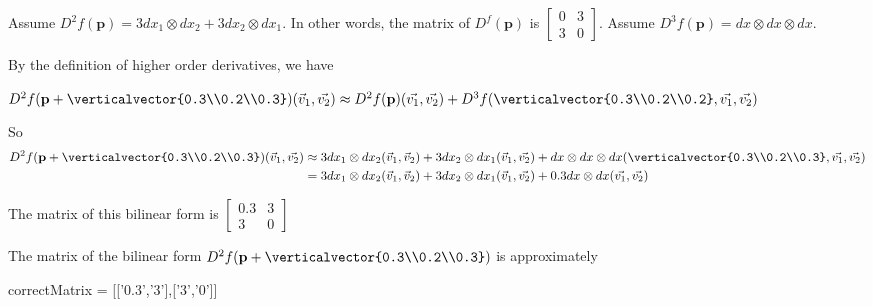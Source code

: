 \documentclass{ximera}
\begin{document}
\begin{question}
  Assume \(D^2f(\mathbf{p}) = 3dx_1\otimes dx_2 + 3dx_2 \otimes dx_1\).  In other words, the matrix of $D^f(\mathbf{p})$ is 
  \(\begin{bmatrix} 0 & 3\\ 3&0 \end{bmatrix}\).  Assume $D^3f(\mathbf{p}) = dx \otimes dx \otimes dx$.
  \begin{solution}
    \begin{hint}
      By the definition of higher order derivatives, we have
      
      \(
      D^2f(\mathbf{p}+\verticalvector{0.3\\0.2\\0.3})(\vec{v}_1,\vec{v_2}) \approx D^2f(\mathbf{p})(\vec{v_1},\vec{v_2}) + D^3f(\verticalvector{0.3\\0.2\\0.2},\vec{v_1},\vec{v_2})
      \)
      
    \end{hint}
    \begin{hint}
      So 
      \begin{align*}
        D^2f(\mathbf{p}+\verticalvector{0.3\\0.2\\0.3})(\vec{v}_1,\vec{v_2}) &\approx 
        3dx_1\otimes dx_2(\vec{v}_1,\vec{v}_2) + 3dx_2 \otimes dx_1 (\vec{v}_1,\vec{v_2}) + dx \otimes dx \otimes dx (\verticalvector{0.3\\0.2\\0.3},\vec{v_1},\vec{v_2})\\
        &=3dx_1\otimes dx_2(\vec{v}_1,\vec{v}_2) + 3dx_2 \otimes dx_1 (\vec{v}_1,\vec{v_2})  + 0.3 dx \otimes dx (\vec{v_1},\vec{v_2})
      \end{align*}
    \end{hint}
    \begin{hint}
      The matrix of this bilinear form is \(\begin{bmatrix} 0.3 & 3\\3&0\end{bmatrix}\)
    \end{hint}
    The matrix of the bilinear form $D^2f(\mathbf{p}+\verticalvector{0.3\\0.2\\0.3})$ is approximately
    \begin{matrix-answer}
      correctMatrix = [['0.3','3'],['3','0']]
    \end{matrix-answer}
  \end{solution}
\end{question}
\end{document}
